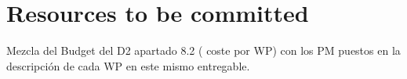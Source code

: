 \section{Resources to be committed}

Mezcla del Budget del D2 apartado 8.2 ( coste por WP) con los PM puestos en la descripción de cada WP en este mismo entregable. 
